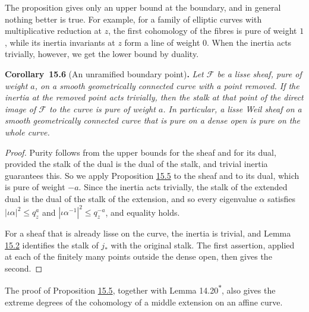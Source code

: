 \documentclass[11pt]{article}
\newenvironment{bpstatement}[2]{\par\addvspace{0.6\baselineskip}\noindent\textbf{#1}#2\textbf{.}\enspace\ignorespaces}
  {\par\addvspace{0.4\baselineskip}}
\newenvironment{bpstatementit}[2]{\begin{bpstatement}{#1}{#2}\itshape\ignorespaces}{\end{bpstatement}}
\newcommand{\bpout}[1]{#1\textsuperscript{\hyperlink{bp-outside}{\ensuremath{\ast}}}}
\begin{document}
\label{bp15}%
The proposition gives only an upper bound at the boundary, and in general nothing better is true. For example, for a family of elliptic curves with multiplicative reduction at \(z\), the first cohomology of the fibres is pure of weight \(1\), while its inertia invariants at \(z\) form a line of weight \(0\). When the inertia acts trivially, however, we get the lower bound by duality.

\label{bp16}%
\begin{bpstatementit}{Corollary~15.6}{ (An unramified boundary point)}
Let \(\mathcal F\) be a lisse sheaf, pure of weight \(a\), on a smooth geometrically connected curve with a point removed. If the inertia at the removed point acts trivially, then the stalk at that point of the direct image of \(\mathcal F\) to the curve is pure of weight \(a\). In particular, a lisse Weil sheaf on a smooth geometrically connected curve that is pure on a dense open is pure on the whole curve.
\end{bpstatementit}

\begin{proof}[{Proof}]\label{bp17}%
Purity follows from the upper bounds for the sheaf and for its dual, provided the stalk of the dual is the dual of the stalk, and trivial inertia guarantees this. So we apply Proposition \hyperref[bp13]{15.5} to the sheaf and to its dual, which is pure of weight \(-a\).  Since the inertia acts trivially, the stalk of the extended dual is the dual of the stalk of the extension, and so every eigenvalue \(\alpha\) satisfies \(|\iota\alpha|^2\le q_z^a\) and \(|\iota\alpha^{-1}|^2\le q_z^{-a}\), and equality holds.

For a sheaf that is already lisse on the curve, the inertia is trivial, and Lemma \hyperref[bp6]{15.2} identifies the stalk of \(j_*\) with the original stalk. The first assertion, applied at each of the finitely many points outside the dense open, then gives the second.
\end{proof}

\label{bp18}%
The proof of Proposition \hyperref[bp13]{15.5}, together with Lemma \bpout{14.20}, also gives the extreme degrees of the cohomology of a middle extension on an affine curve.
\end{document}
